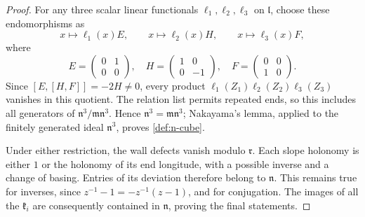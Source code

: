 \begin{proof}
For any three scalar linear functionals \(\ell_1,\ell_2,\ell_3\)
on \(\mathfrak l\), choose these endomorphisms as
\[
 x\longmapsto\ell_1(x)E,\qquad
 x\longmapsto\ell_2(x)H,\qquad
 x\longmapsto\ell_3(x)F,
\]
where
\[
 E=\begin{pmatrix}0&1\\0&0\end{pmatrix},\quad
 H=\begin{pmatrix}1&0\\0&-1\end{pmatrix},\quad
 F=\begin{pmatrix}0&0\\1&0\end{pmatrix}.
\]
Since \([E,[H,F]]=-2H\ne0\), every product
\(\ell_1(Z_1)\ell_2(Z_2)\ell_3(Z_3)\) vanishes in this quotient.
The relation list permits repeated ends, so this includes all
generators of \(\mathfrak n^3/\mathfrak m\mathfrak n^3\).
Hence \(\mathfrak n^3=\mathfrak m\mathfrak n^3\); Nakayama's lemma,
applied to the finitely generated ideal \(\mathfrak n^3\), proves
\eqref{def:n-cube}.

Under either restriction, the wall defects vanish modulo
\(\mathfrak r\).  Each slope holonomy is either \(1\) or the
holonomy of its end longitude, with a possible inverse and a
change of basing.  Entries of its deviation therefore belong to
\(\mathfrak n\).  This remains true for inverses, since
\(z^{-1}-1=-z^{-1}(z-1)\), and for conjugation.  The images of all
the \(\mathfrak k_i\) are consequently contained in
\(\mathfrak n\), proving the final statements.
\end{proof}

